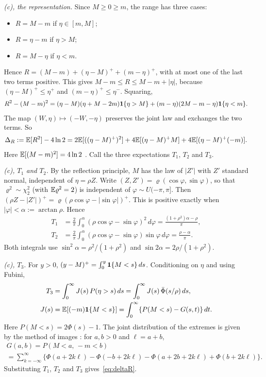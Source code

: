 \emph{(c), the representation.} Since $M\ge0\ge m$, the range has three cases:
\begin{itemize}
  \item $R=M-m$ if $\eta\in[m,M]$;
  \item $R=\eta-m$ if $\eta>M$;
  \item $R=M-\eta$ if $\eta<m$.
\end{itemize}
Hence $R=(M-m)+(\eta-M)^++(m-\eta)^+$, with at most one of the last two terms positive. This gives
$M-m\le R\le M-m+|\eta|$, because $(\eta-M)^+\le\eta^+$ and $(m-\eta)^+\le\eta^-$. Squaring,
\[
  R^2-(M-m)^2=(\eta-M)(\eta+M-2m)\mathbf{1}\{\eta>M\}+(m-\eta)(2M-m-\eta)\mathbf{1}\{\eta<m\}.
\]
The map $(W,\eta)\mapsto(-W,-\eta)$ preserves the joint law and exchanges the two terms. So
\begin{equation*}
  \Delta_R:=\mathbb{E}[R^2]-4\ln2=2\mathbb{E}[((\eta-M)^+)^2]+4\mathbb{E}[(\eta-M)^+M]+4\mathbb{E}[(\eta-M)^+(-m)].
\end{equation*}
Here $\mathbb{E}[(M-m)^2]=4\ln2$ \citep{Feller1951,Parkinson1980}. Call the three expectations $T_1$,
$T_2$ and $T_3$.

\emph{(c), $T_1$ and $T_2$.} By the reflection principle, $M$ has the law of $|Z'|$ with $Z'$
standard normal, independent of $\eta=\rho Z$. Write $(Z,Z')=\varrho(\cos\varphi,\sin\varphi)$, so
that $\varrho^2\sim\chi^2_2$ (with $\mathbb{E}\varrho^2=2$) is independent of
$\varphi\sim U(-\pi,\pi]$. Then $(\rho Z-|Z'|)^+=\varrho(\rho\cos\varphi-|\sin\varphi|)^+$. This is
positive exactly when $|\varphi|<\alpha:=\arctan\rho$. Hence
\begin{align*}
T_1&=\frac{2}{\pi}\int_0^\alpha(\rho\cos\varphi-\sin\varphi)^2\,d\varphi=\frac{(1+\rho^2)\alpha-\rho}{\pi},\\
T_2&=\frac{2}{\pi}\int_0^\alpha(\rho\cos\varphi-\sin\varphi)\sin\varphi\,d\varphi=\frac{\rho-\alpha}{\pi}.
\end{align*}
Both integrals use $\sin^2\alpha=\rho^2/(1+\rho^2)$ and $\sin2\alpha=2\rho/(1+\rho^2)$.

\emph{(c), $T_3$.} For $y>0$, $(y-M)^+=\int_0^y\mathbf{1}\{M<s\}\,ds$. Conditioning on $\eta$ and using
Fubini,
\begin{align*}
  T_3&=\int_0^\infty J(s)\,P(\eta>s)\,ds=\int_0^\infty J(s)\,\bar\Phi(s/\rho)\,ds,\\
  J(s)&=\mathbb{E}[(-m)\mathbf{1}\{M<s\}]=\int_0^\infty\{P(M<s)-G(s,t)\}\,dt.
\end{align*}
Here $P(M<s)=2\Phi(s)-1$. The joint distribution of the extremes is given by the method of images
\citep[e.g.][]{BorodinSalminen2002}: for $a,b>0$ and $\ell=a+b$,
\begin{multline}\label{eq:G}
  G(a,b)=P(M<a,\,-m<b)\\=\sum_{k=-\infty}^{\infty}\bigl\{\Phi(a+2k\ell)-\Phi(-b+2k\ell)-\Phi(a+2b+2k\ell)+\Phi(b+2k\ell)\bigr\}.
\end{multline}
Substituting $T_1$, $T_2$ and $T_3$ gives~\eqref{eq:deltaR}.

